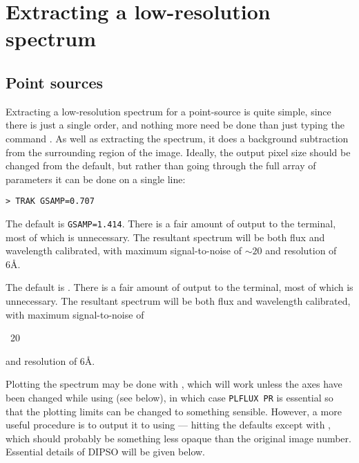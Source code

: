 \section{Extracting a low-resolution spectrum}

\subsection{Point sources}

Extracting a low-resolution spectrum for a point-source is quite simple,
since there is just a single order, and nothing more need be done than just
typing the command \@.  As well as extracting the 
spectrum, it does a background subtraction from the surrounding region of the 
image.  Ideally,
the output pixel size should be changed from the default, but rather than
going through the full array of parameters it can be done on a single line:

\begin{verbatim}
> TRAK GSAMP=0.707
\end{verbatim}

\begin{latexonly}
The default is \verb+GSAMP=1.414+\@.  There is a fair amount of output to the
terminal, most of which is unnecessary.  The resultant spectrum will be both
flux and wavelength calibrated, with maximum signal-to-noise of $\sim 20$ and
resolution of 6\AA\@.
\end{latexonly}

\begin{htmlonly}
The default is \@.  There is a fair 
amount of output to the
terminal, most of which is unnecessary.  The resultant spectrum will be both
flux and wavelength calibrated, with maximum signal-to-noise of
\begin{rawhtml}~20\end{rawhtml} and resolution of 6\AA\@.
\end{htmlonly}

Plotting the spectrum may be done with , 
which will work unless
the axes have been changed while using  
(see below), in which
case \verb+PLFLUX PR+ is essential so that the plotting limits can be changed
to something sensible.  However, a more useful procedure is to output it to
 using  --- 
hitting the defaults except with
, which should probably be something less 
opaque than the original image number.  Essential details of DIPSO will be 
given below.

